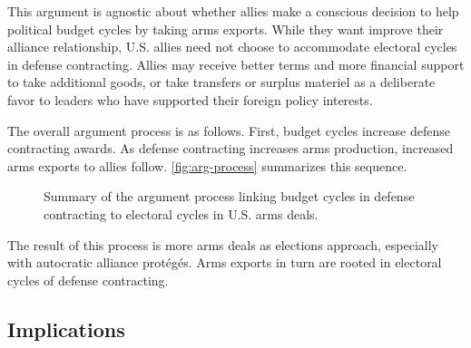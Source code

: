 \documentclass[12pt]{article}
\begin{document}
This argument is agnostic about whether allies make a conscious decision to help political budget cycles by taking arms exports.
While they want improve their alliance relationship, U.S. allies need not choose to accommodate electoral cycles in defense contracting.
Allies may receive better terms and more financial support to take additional goods, or take transfers or surplus materiel as a deliberate favor to leaders who have supported their foreign policy interests. 


The overall argument process is as follows.
First, budget cycles increase defense contracting awards. 
As defense contracting increases arms production, increased arms exports to allies follow. 
\autoref{fig:arg-process} summarizes this sequence.


\begin{figure}[htpb]
\caption{Summary of the argument process linking budget cycles in defense contracting to electoral cycles in U.S. arms deals.}
\label{fig:arg-process}
\end{figure}




The result of this process is more arms deals as elections approach, especially with autocratic alliance prot{\'e}g{\'e}s.
Arms exports in turn are rooted in electoral cycles of defense contracting.



\subsection{Implications}
\end{document}
